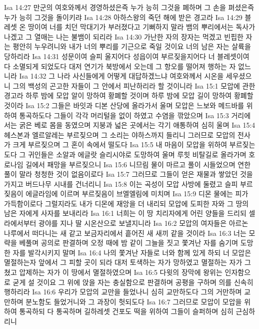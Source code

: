 Isa 14:27  만군의 여호와께서 경영하셨은즉 누가 능히 그것을 폐하며 그 손을 펴셨은즉 누가 능히 그것을 돌이키랴
Isa 14:28  아하스왕의 죽던 해에 받은 경고라
Isa 14:29  블레셋 온 땅이여 너를 치던 막대기가 부러졌다고 기뻐하지 말라 뱀의 뿌리에서는 독사가 나겠고 그 열매는 나는 불뱀이 되리라
Isa 14:30  가난한 자의 장자는 먹겠고 빈핍한 자는 평안히 누우려니와 내가 너의 뿌리를 기근으로 죽일 것이요 너의 남은 자는 살륙을 당하리라
Isa 14:31  성문이여 슬피 울지어다 성읍이여 부르짖을지어다 너 블레셋이여 다 소멸되게 되었도다 대저 연기가 북방에서 오는데 그 항오를 떨어져 행하는 자 없느니라
Isa 14:32  그 나라 사신들에게 어떻게 대답하겠느냐 여호와께서 시온을 세우셨으니 그의 백성의 곤고한 자들이 그 안에서 피난하리라 할 것이니라
Isa 15:1  모압에 관한 경고라 하루 밤에 모압 알이 망하여 황폐할 것이며 하루 밤에 모압 길이 망하여 황폐할 것이라
Isa 15:2  그들은 바잇과 디본 산당에 올라가서 울며 모압은 느보와 메드바를 위하여 통곡하도다 그들이 각각 머리털을 없이 하였고 수염을 깎았으며
Isa 15:3  거리에서는 굵은 베로 몸을 동였으며 지붕과 넓은 곳에서는 각기 애통하여 심히 울며
Isa 15:4  헤스본과 엘르알레는 부르짖으며 그 소리는 야하스까지 들리니 그러므로 모압의 전사가 크게 부르짖으며 그 혼이 속에서 떨도다
Isa 15:5  내 마음이 모압을 위하여 부르짖는도다 그 귀인들은 소알과 에글랏 슬리시야로 도망하여 울며 루힛 비탈길로 올라가며 호로나임 길에서 패망을 부르짖으니
Isa 15:6  니므림 물이 마르고 풀이 시들었으며 연한 풀이 말라 청청한 것이 없음이로다
Isa 15:7  그러므로 그들이 얻은 재물과 쌓았던 것을 가지고 버드나무 시내를 건너리니
Isa 15:8  이는 곡성이 모압 사방에 둘렸고 슬피 부르짖음이 에글라임에 이르며 부르짖음이 브엘엘림에 미치며
Isa 15:9  디몬 물에는 피가 가득함이로다 그럴지라도 내가 디몬에 재앙을 더 내리되 모압에 도피한 자와 그 땅의 남은 자에게 사자를 보내리라
Isa 16:1  너희는 이 땅 치리자에게 어린 양들을 드리되 셀라에서부터 광야를 지나 딸 시온산으로 보낼지니라
Isa 16:2  모압의 여자들은 아르논 나루에서 떠다니는 새 같고 보금자리에서 흩어진 새 새끼 같을 것이라
Isa 16:3  너는 모략을 베풀며 공의로 판결하며 오정 때에 밤 같이 그늘을 짓고 쫓겨난 자를 숨기며 도망한 자를 발각시키지 말며
Isa 16:4  나의 쫓겨난 자들로 너와 함께 있게 하되 너 모압은 멸절하는자 앞에서 그 피할 곳이 되라 대저 토색하는 자가 망하였고 멸절하는 자가 그쳤고 압제하는 자가 이 땅에서 멸절하였으며
Isa 16:5  다윗의 장막에 왕위는 인자함으로 굳게 설 것이요 그 위에 앉을 자는 충실함으로 판결하며 공평을 구하며 의를 신속히 행하리라
Isa 16:6  우리가 모압의 교만을 들었나니 심히 교만하도다 그의 거만하며 교만하며 분노함도 들었거니와 그 과장이 헛되도다
Isa 16:7  그러므로 모압이 모압을 위하여 통곡하되 다 통곡하며 길하레셋 건포도 떡을 위하여 그들이 슬퍼하며 심히 근심하리니
